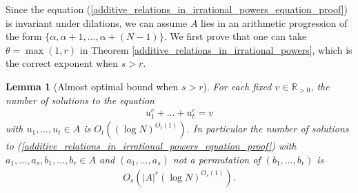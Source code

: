 \documentclass[9pt]{amsart}
\theoremstyle{my_theorem_style}
\numberwithin{definition}{section}
\newtheorem{lemma}[definition]{Lemma}
\newcommand{\R}{\mathbb{R}}
\begin{document}
Since the equation (\ref{additive_relations_in_irrational_powers_equation_proof}) is invariant under dilations, we can assume $A$ lies in an arithmetic progression of the form $\{\alpha, \alpha + 1, \dots, \alpha + (N - 1)\}$. We first prove that one can take $\theta = \max(1, r)$ in Theorem \ref{additive_relations_in_irrational_powers}, which is the correct exponent when $s > r$.

\begin{lemma}
[Almost optimal bound when $s > r$]
\label{sum_of_irrational_powers_equals_fixed}
    For each fixed $v \in \R_{>0}$, the number of solutions to the equation
    \begin{align}
    \label{sum_of_irrational_powers_equals_fixed_equation}
        u_1^c + \dots + u_t^c = v
    \end{align}
    with $u_1, \dots, u_t \in A$ is $O_t((\log{N})^{O_t(1)})$. In particular the number of solutions to (\ref{additive_relations_in_irrational_powers_equation_proof}) with $a_1, \dots, a_s, b_1, \dots, b_r \in A$ and $(a_1, \dots, a_s)$ not a permutation of $(b_1, \dots, b_r)$ is
    \begin{align*}
        O_s(|A|^r(\log{N})^{O_s(1)}).
    \end{align*}
\end{lemma}
\end{document}
